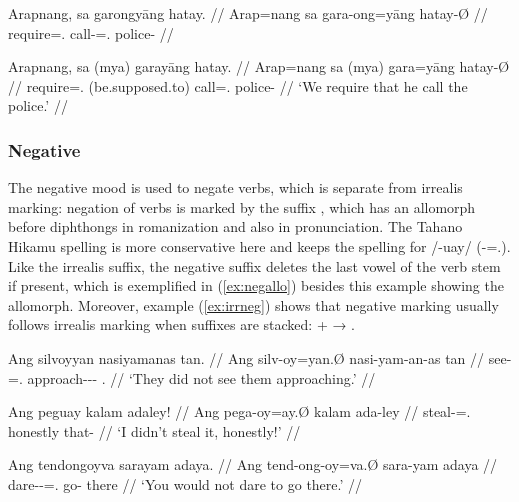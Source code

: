 \pex
\a\ljudge*\begingl
	\gla Arapnang, sa garongyāng hatay. //
	\glb Arap=nang sa gara-ong=yāng hatay-Ø //
	\glc require=\Fpl{}.\Aarg{} \PatT{} call-\Irr{}=\TsgM{}.\Aarg{} 
		police-\Top{} //
\endgl

\a\label{ex:myashall}\begingl
	\gla Arapnang, sa (mya) garayāng hatay. //
	\glb Arap=nang sa (mya) gara=yāng hatay-Ø //
	\glc require=\Fpl{}.\Aarg{} \PatT{} (be.supposed.to) 
		call=\TsgM{}.\Aarg{} police-\Top{} //
	\glft `We require that he call the police.' //
\endgl
\xe


\subsubsection{Negative}
\label{subsubsec:verbneg}

The negative mood is used to negate verbs, which is separate from irrealis
marking: negation of verbs is marked by the suffix , which has
an allomorph  before diphthongs in romanization and also in
pronunciation. The Tahano Hikamu spelling is more conservative here and keeps
the spelling   for /-uay/
(\mbox{-\Neg{}=\Fsg{}.\Top{}}). Like the irrealis suffix, the
negative suffix deletes the last vowel of the verb stem if present, which is
exemplified in (\ref{ex:negallo}) besides this example showing the 
allomorph. Moreover, example (\ref{ex:irrneg}) shows that negative marking
usually follows irrealis marking when suffixes are stacked:  +
 → .

\pex
\a\label{ex:negative}\begingl
	\gla Ang silvoyyan nasiyamanas tan. //
	\glb Ang silv-oy=yan.Ø nasi-yam-an-as tan //
	\glc \AgtT{} see-\Neg{}=\TplM{}.\Top{} approach-\Ptcp{}-\Nmlz{}-\Parg{} 
		\TplM{}.\Gen{} //
	\glft `They did not see them approaching.' //
\endgl

\a\label{ex:negallo}\begingl
	\gla Ang peguay kalam adaley!  //
	\glb Ang pega-oy=ay.Ø kalam ada-ley //
	\glc \AgtT{} steal-\Neg{}=\Fsg{}.\Top{} honestly that-\PargI{} //
	\glft `I didn't steal it, honestly!' //
\endgl

\a\label{ex:irrneg}\begingl
	\gla Ang tendongoyva sarayam adaya. //
	\glb Ang tend-ong-oy=va.Ø sara-yam adaya //
	\glc \AgtT{} dare-\Irr{}-\Neg{}=\Ssg{}.\Top{} go-\Ptcp{} there //
	\glft `You would not dare to go there.' //
\endgl

\xe

